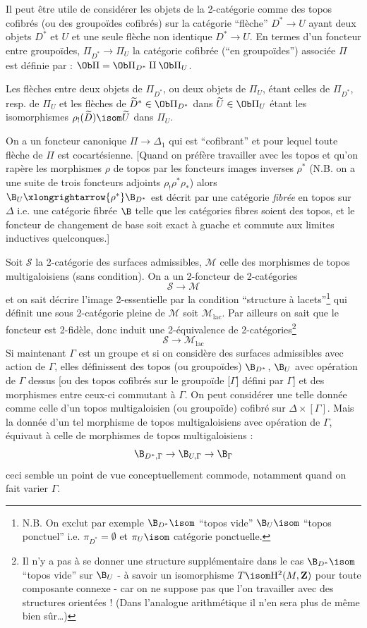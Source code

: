 Il peut être utile de considérer les objets de la 2-catégorie comme des topos cofibrés (ou des groupoïdes cofibrés) sur la catégorie ``flèche'' $D^* \to U$ ayant deux objets $D^*$ et $U$ et une seule flèche non identique $D^* \to U$. En termes d'un foncteur entre groupoïdes, $\Pi_{D^*} \to \Pi_U$ la catégorie cofibrée (``en groupoïdes'') associée $\Pi$ est définie par : $\Ob \Pi = \Ob \Pi_{D^*} \amalg \Ob \Pi_U$.

Les flèches entre deux objets de $\Pi_{D^*}$, ou deux objets de $\Pi_U$, étant celles de $\Pi_{D^*}$, resp. de $\Pi_U$ et les flèches de $\widetilde{D}^* \in \Ob \Pi_{D^*}$ dans $\widetilde{U} \in \Ob \Pi_U$ étant les isomorphismes $\rho_!(\widetilde{D}) \isom \widetilde{U}$ dans $\Pi_U$.

On a un foncteur canonique $\Pi \to \Delta_1$ qui est ``cofibrant'' et pour lequel toute flèche de $\Pi$ est cocartésienne. [Quand on préfère travailler avec les topos et qu'on rapère les morphismes $\rho$ de topos par les foncteurs images inverses $\rho^*$ (N.B. on a une suite de trois foncteurs adjoints $\rho_! \rho^* \rho_*$) alors $\B_U \xlongrightarrow{\rho^*} \B_{D^*}$ est décrit par une catégorie \emph{fibrée} en topos sur $\Delta$ i.e. une catégorie fibrée $\B$ telle que les catégories fibres soient des topos, et le foncteur de changement de base soit exact à guache et commute aux limites inductives quelconques.]

Soit $\mathscr{S}$ la 2-catégorie des surfaces admissibles, $\mathscr{M}$ celle des morphismes de topos multigaloisiens (sans condition). On a un 2-foncteur de 2-catégories
$$
\mathscr{S} \to \mathscr{M}
$$
et on sait décrire l'image 2-essentielle par la condition ``structure à lacets''\footnote{N.B. On exclut par exemple $\B_{D^*} \isom$ ``topos vide'' $\B_U \isom$ ``topos ponctuel'' i.e. $\pi_{D^*} = \emptyset$ et $\pi_U \isom$ catégorie ponctuelle.} qui définit une sous 2-catégorie pleine de $\mathscr{M}$ soit $\mathscr{M}_{\text{lac}}$. Par ailleurs on sait que le foncteur est 2-fidèle, donc induit une 2-équivalence de 2-catégories\footnote{Il n'y a pas à se donner une structure supplémentaire dans le cas $\B_{D^*} \isom$ ``topos vide'' sur $\B_U$ - à savoir un isomorphisme $T \isom \mathrm{H}^2(M, \mathbf{Z})$ pour toute composante connexe - car on ne suppose pas que l'on travailler avec des structures orientées ! (Dans l'analogue arithmétique il n'en sera plus de   même bien sûr\dots)}
$$
\mathscr{S} \to \mathscr{M}_{\text{lac}}
$$
Si maintenant $\Gamma$ est un groupe et si on considère des surfaces admissibles avec action de $\Gamma$, elles définissent des topos (ou groupoïdes) $\B_{D^*}$, $\B_U$ avec opération de $\Gamma$ dessus [ou des topos cofibrés sur le groupoïde [$\Gamma$] défini par $\Gamma$] et des morphismes entre ceux-ci commutant à $\Gamma$. On peut considérer une telle donnée comme celle d'un topos multigaloisien (ou groupoïde) cofibré sur $\Delta \times [\Gamma]$. Mais la donnée d'un tel morphisme de topos multigaloisiens avec opération de $\Gamma$, équivaut à celle de morphismes de topos multigaloisiens :
$$
\B_{D^*, \Gamma} \to \B_{U, \Gamma} \to \B_{\Gamma}
$$
ceci semble un point de vue conceptuellement commode, notamment quand on fait varier $\Gamma$.

